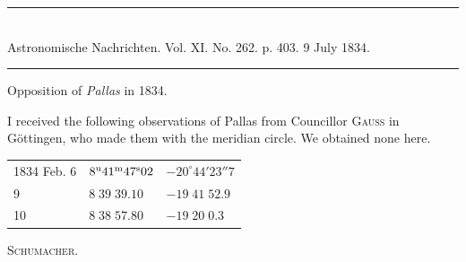 \clearpage
\hypertarget{native-468-pallas}{}
\begin{center}
\rule{0.55\linewidth}{0.4pt}\\[2pt]
Astronomische Nachrichten. Vol. XI. No. 262. p. 403. 9 July 1834.\\[2pt]
\rule{0.55\linewidth}{0.4pt}
\end{center}

\begin{center}Opposition of \emph{Pallas} in 1834.\end{center}

I received the following observations of Pallas from Councillor \textsc{Gauss} in Göttingen, who made them with the meridian circle. We obtained none here.

\begin{center}
\begin{tabular}{l|l|l}
1834 Feb. 6 & $8^{\rm u}41^{\rm m}47^{\rm s}02$ & $-20^\circ44'23''7$ \\
\hfill 9 & $8\;39\;39.10$ & $-19\;41\;52.9$ \\
\hfill 10 & $8\;38\;57.80$ & $-19\;20\;0.3$ \\
\end{tabular}
\end{center}
\begin{flushright}\textsc{Schumacher.}\end{flushright}

